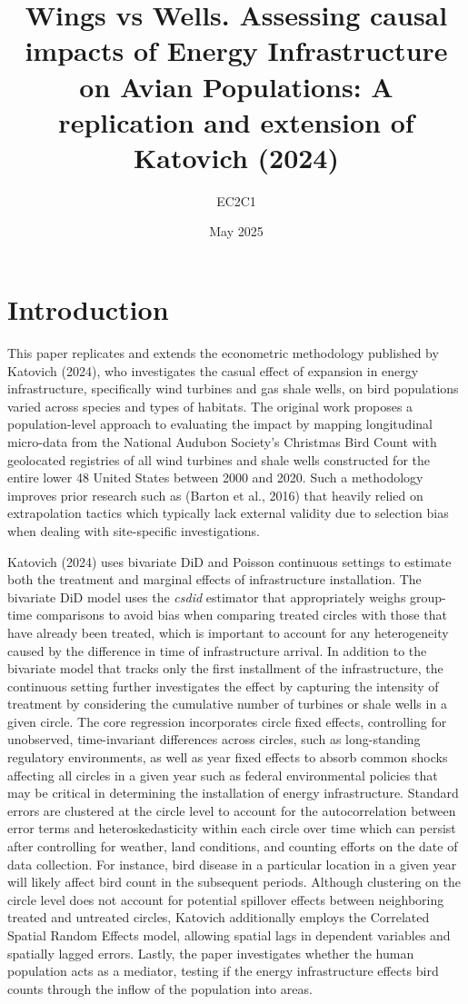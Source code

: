 \documentclass{article}
\title{Wings vs Wells. Assessing causal impacts of Energy Infrastructure on Avian Populations: A replication and extension of Katovich (2024)}
\author{EC2C1}
\date{May 2025}
\begin{document}
\maketitle

\section{Introduction}

This paper replicates and extends the econometric methodology published by Katovich (2024), who investigates the casual effect of expansion in energy infrastructure, specifically wind turbines and gas shale wells, on bird populations varied across species and types of habitats. The original work proposes a population-level approach to evaluating the impact by mapping longitudinal micro-data from the National Audubon Society’s Christmas Bird Count with geolocated registries of all wind turbines and shale wells constructed for the entire lower 48 United States between 2000 and 2020. Such a methodology improves prior research such as (Barton et al., 2016) that heavily relied on extrapolation tactics which typically lack external validity due to selection bias when dealing with site-specific investigations.
 
\addlinespace

Katovich (2024) uses bivariate DiD and Poisson continuous settings to estimate both the treatment and marginal effects of infrastructure installation. The bivariate DiD model uses the \textit{csdid} estimator that appropriately weighs group-time comparisons to avoid bias when comparing treated circles with those that have already been treated, which is important to account for any heterogeneity caused by the difference in time of infrastructure arrival. In addition to the bivariate model that tracks only the first installment of the infrastructure, the continuous setting further investigates the effect by capturing the intensity of treatment by considering the cumulative number of turbines or shale wells in a given circle. The core regression incorporates circle fixed effects, controlling for unobserved, time-invariant differences across circles, such as long-standing regulatory environments, as well as year fixed effects to absorb common shocks affecting all circles in a given year such as federal environmental policies that may be critical in determining the installation of energy infrastructure. Standard errors are clustered at the circle level to account for the autocorrelation between error terms and heteroskedasticity within each circle over time which can persist after controlling for weather, land conditions, and counting efforts on the date of data collection. For instance, bird disease in a particular location in a given year will likely affect bird count in the subsequent periods. Although clustering on the circle level does not account for potential spillover effects between neighboring treated and untreated circles, Katovich additionally employs the Correlated Spatial Random Effects model, allowing spatial lags in dependent variables and spatially lagged errors. Lastly, the paper investigates whether the human population acts as a mediator, testing if the energy infrastructure effects bird counts through the inflow of the population into areas. 
\end{document}
